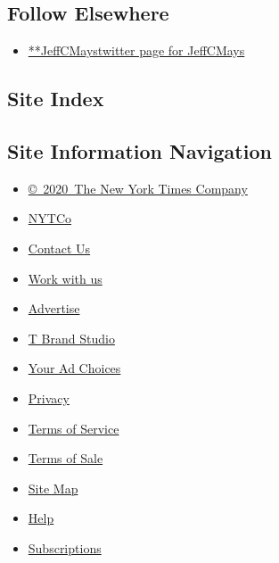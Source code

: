 \hypertarget{follow-elsewhere}{%
\subsection{Follow Elsewhere}\label{follow-elsewhere}}

\begin{itemize}
\tightlist
\item
  \href{https://twitter.com/JeffCMays}{**JeffCMaystwitter page for
  JeffCMays}
\end{itemize}

\hypertarget{site-index}{%
\subsection{Site Index}\label{site-index}}

\hypertarget{site-information-navigation}{%
\subsection{Site Information
Navigation}\label{site-information-navigation}}

\begin{itemize}
\tightlist
\item
  \href{https://help.nytimes3xbfgragh.onion/hc/en-us/articles/115014792127-Copyright-notice}{©~2020~The
  New York Times Company}
\end{itemize}

\begin{itemize}
\tightlist
\item
  \href{https://www.nytco.com/}{NYTCo}
\item
  \href{https://help.nytimes3xbfgragh.onion/hc/en-us/articles/115015385887-Contact-Us}{Contact
  Us}
\item
  \href{https://www.nytco.com/careers/}{Work with us}
\item
  \href{https://nytmediakit.com/}{Advertise}
\item
  \href{http://www.tbrandstudio.com/}{T Brand Studio}
\item
  \href{https://www.nytimes3xbfgragh.onion/privacy/cookie-policy\#how-do-i-manage-trackers}{Your
  Ad Choices}
\item
  \href{https://www.nytimes3xbfgragh.onion/privacy}{Privacy}
\item
  \href{https://help.nytimes3xbfgragh.onion/hc/en-us/articles/115014893428-Terms-of-service}{Terms
  of Service}
\item
  \href{https://help.nytimes3xbfgragh.onion/hc/en-us/articles/115014893968-Terms-of-sale}{Terms
  of Sale}
\item
  \href{https://spiderbites.nytimes3xbfgragh.onion}{Site Map}
\item
  \href{https://help.nytimes3xbfgragh.onion/hc/en-us}{Help}
\item
  \href{https://www.nytimes3xbfgragh.onion/subscription?campaignId=37WXW}{Subscriptions}
\end{itemize}
